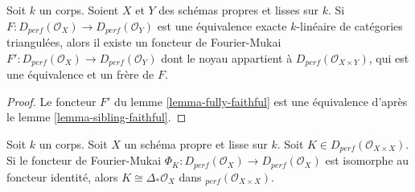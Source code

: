 \begin{proposition}
\label{proposition-equivalence}
Soit $k$ un corps. Soient $X$ et $Y$ des schémas propres et lisses sur $k$.
Si $F : D_{perf}(\mathcal{O}_X) \to D_{perf}(\mathcal{O}_Y)$
est une équivalence exacte $k$-linéaire de catégories triangulées, alors
il existe un foncteur de Fourier-Mukai
$F' : D_{perf}(\mathcal{O}_X) \to D_{perf}(\mathcal{O}_Y)$ dont le
noyau appartient à $D_{perf}(\mathcal{O}_{X \times Y})$,
qui est une équivalence et un frère de $F$.
\end{proposition}

\begin{proof}
Le foncteur $F'$ du lemme \ref{lemma-fully-faithful}
est une équivalence d'après le lemme \ref{lemma-sibling-faithful}.
\end{proof}

\begin{lemma}
\label{lemma-uniqueness}
Soit $k$ un corps. Soit $X$ un schéma propre et lisse sur $k$.
Soit $K \in D_{perf}(\mathcal{O}_{X \times X})$. Si le foncteur de Fourier-Mukai
$\Phi_K : D_{perf}(\mathcal{O}_X) \to D_{perf}(\mathcal{O}_X)$
est isomorphe au foncteur identité, alors
$K \cong \Delta_*\mathcal{O}_X$ dans $_{perf}(\mathcal{O}_{X \times X})$.
\end{lemma}

